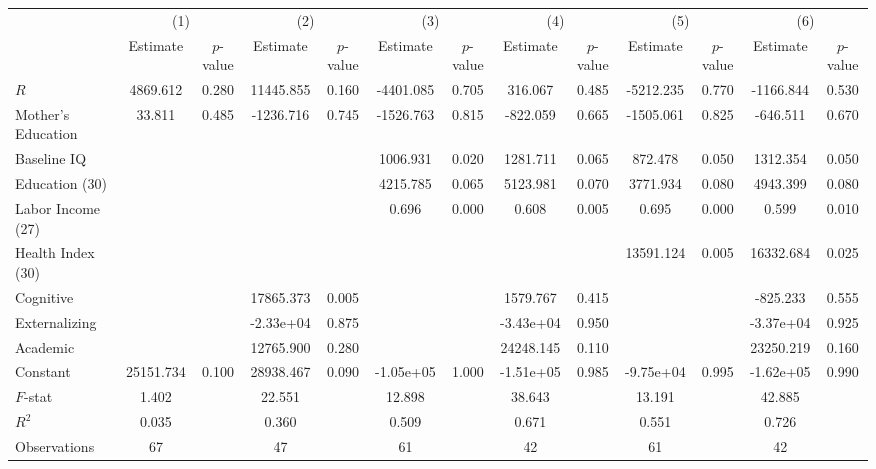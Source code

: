 \begin{table}[htbp]
\begin{tabular}{lcccccccccccc} \toprule
 & \multicolumn{2}{c}{(1)}  &  \multicolumn{2}{c}{(2)}  &  \multicolumn{2}{c}{(3)}  &  \multicolumn{2}{c}{(4)}  & \multicolumn{2}{c}{(5)} & \multicolumn{2}{c}{(6)} \\  
 & Estimate & $p$-value & Estimate & $p$-value & Estimate & $p$-value & Estimate & $p$-value & Estimate & $p$-value & Estimate & $p$-value \\ \midrule
$R$ &  4869.612 &     0.280 & 11445.855 &     0.160 & -4401.085 &     0.705 &   316.067 &     0.485 & -5212.235 &     0.770 & -1166.844 &     0.530 \\  
Mother's Education &    33.811 &     0.485 & -1236.716 &     0.745 & -1526.763 &     0.815 &  -822.059 &     0.665 & -1505.061 &     0.825 &  -646.511 &     0.670 \\  
Baseline IQ &         &         &         &         &  1006.931 &     0.020 &  1281.711 &     0.065 &   872.478 &     0.050 &  1312.354 &     0.050 \\  
Education (30) &         &         &         &         &  4215.785 &     0.065 &  5123.981 &     0.070 &  3771.934 &     0.080 &  4943.399 &     0.080 \\  
Labor Income (27) &         &         &         &         &     0.696 &     0.000 &     0.608 &     0.005 &     0.695 &     0.000 &     0.599 &     0.010 \\  
Health Index (30) &         &         &         &         &         &         &         &         & 13591.124 &     0.005 & 16332.684 &     0.025 \\  
Cognitive &         &         & 17865.373 &     0.005 &         &         &  1579.767 &     0.415 &         &         &  -825.233 &     0.555 \\  
Externalizing &         &         & -2.33e+04 &     0.875 &         &         & -3.43e+04 &     0.950 &         &         & -3.37e+04 &     0.925 \\  
Academic &         &         & 12765.900 &     0.280 &         &         & 24248.145 &     0.110 &         &         & 23250.219 &     0.160 \\  
Constant & 25151.734 &     0.100 & 28938.467 &     0.090 & -1.05e+05 &     1.000 & -1.51e+05 &     0.985 & -9.75e+04 &     0.995 & -1.62e+05 &     0.990 \\  \midrule
$F$-stat &     1.402 &         &    22.551 &         &    12.898 &         &    38.643 &         &    13.191 &         &    42.885 &         \\  
$R^2$ &     0.035 &         &     0.360 &         &     0.509 &         &     0.671 &         &     0.551 &         &     0.726 &         \\  
Observations &    67 &         &    47 &         &    61 &         &    42 &         &    61 &         &    42 &         \\  
\bottomrule \end{tabular}
\end{table}
